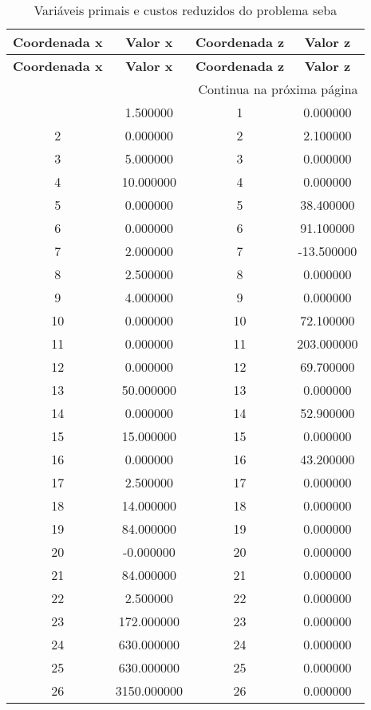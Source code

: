 \documentclass[12pt]{article}
\begin{document}
\begin{longtable}{@{}cccc@{}}
\caption{Variáveis primais e custos reduzidos do problema seba} \\
\toprule
\textbf{Coordenada x} & \textbf{Valor x} & \textbf{Coordenada z} & \textbf{Valor z} \\
\midrule
\endfirsthead

\toprule
\textbf{Coordenada x} & \textbf{Valor x} & \textbf{Coordenada z} & \textbf{Valor z} \\
\midrule
\endhead

\midrule \multicolumn{4}{r}{{Continua na próxima página}} \\ \midrule
\endfoot

\bottomrule
\endlastfoot
1 & 1.500000 & 1 & 0.000000 \\
2 & 0.000000 & 2 & 2.100000 \\
3 & 5.000000 & 3 & 0.000000 \\
4 & 10.000000 & 4 & 0.000000 \\
5 & 0.000000 & 5 & 38.400000 \\
6 & 0.000000 & 6 & 91.100000 \\
7 & 2.000000 & 7 & -13.500000 \\
8 & 2.500000 & 8 & 0.000000 \\
9 & 4.000000 & 9 & 0.000000 \\
10 & 0.000000 & 10 & 72.100000 \\
11 & 0.000000 & 11 & 203.000000 \\
12 & 0.000000 & 12 & 69.700000 \\
13 & 50.000000 & 13 & 0.000000 \\
14 & 0.000000 & 14 & 52.900000 \\
15 & 15.000000 & 15 & 0.000000 \\
16 & 0.000000 & 16 & 43.200000 \\
17 & 2.500000 & 17 & 0.000000 \\
18 & 14.000000 & 18 & 0.000000 \\
19 & 84.000000 & 19 & 0.000000 \\
20 & -0.000000 & 20 & 0.000000 \\
21 & 84.000000 & 21 & 0.000000 \\
22 & 2.500000 & 22 & 0.000000 \\
23 & 172.000000 & 23 & 0.000000 \\
24 & 630.000000 & 24 & 0.000000 \\
25 & 630.000000 & 25 & 0.000000 \\
26 & 3150.000000 & 26 & 0.000000 \\

\end{longtable}
\end{document}
